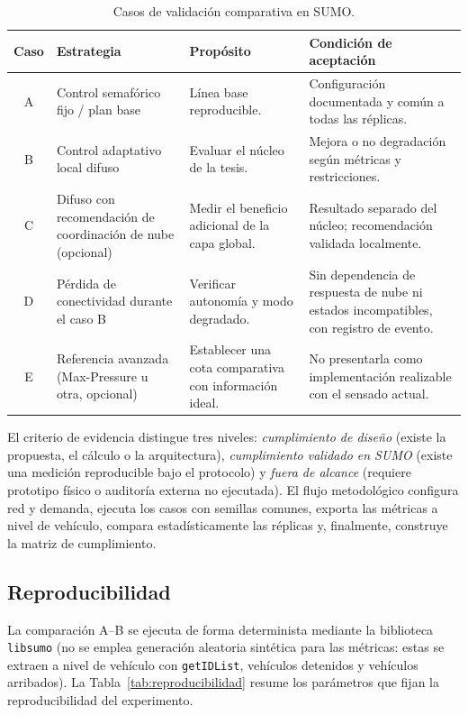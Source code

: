 \begin{table}[H]
  \centering
  \footnotesize
  \caption{Casos de validación comparativa en SUMO.}
  \label{tab:casos-validacion}
  \begin{tabularx}{\linewidth}{@{}cX X X@{}}
    \toprule
    \textbf{Caso} & \textbf{Estrategia} & \textbf{Propósito} & \textbf{Condición de aceptación}\\
    \midrule
    A & Control semafórico fijo / plan base & Línea base reproducible. & Configuración documentada y común a todas las réplicas.\\
    B & Control adaptativo local difuso & Evaluar el núcleo de la tesis. & Mejora o no degradación según métricas y restricciones.\\
    C & Difuso con recomendación de coordinación de nube (opcional) & Medir el beneficio adicional de la capa global. & Resultado separado del núcleo; recomendación validada localmente.\\
    D & Pérdida de conectividad durante el caso B & Verificar autonomía y modo degradado. & Sin dependencia de respuesta de nube ni estados incompatibles, con registro de evento.\\
    E & Referencia avanzada (Max-Pressure u otra, opcional) & Establecer una cota comparativa con información ideal. & No presentarla como implementación realizable con el sensado actual.\\
    \bottomrule
  \end{tabularx}
\end{table}

El criterio de evidencia distingue tres niveles: \emph{cumplimiento de diseño} (existe la
propuesta, el cálculo o la arquitectura), \emph{cumplimiento validado en SUMO} (existe una
medición reproducible bajo el protocolo) y \emph{fuera de alcance} (requiere prototipo
físico o auditoría externa no ejecutada). El flujo metodológico configura red y demanda,
ejecuta los casos con semillas comunes, exporta las métricas a nivel de vehículo, compara
estadísticamente las réplicas y, finalmente, construye la matriz de cumplimiento.

\subsection{Reproducibilidad}\label{sec:reproducibilidad}

La comparación A--B se ejecuta de forma determinista mediante la biblioteca \texttt{libsumo}
(no se emplea generación aleatoria sintética para las métricas: estas se extraen a nivel de
vehículo con \texttt{getIDList}, vehículos detenidos y vehículos arribados). La
Tabla~\ref{tab:reproducibilidad} resume los parámetros que fijan la reproducibilidad del
experimento.

